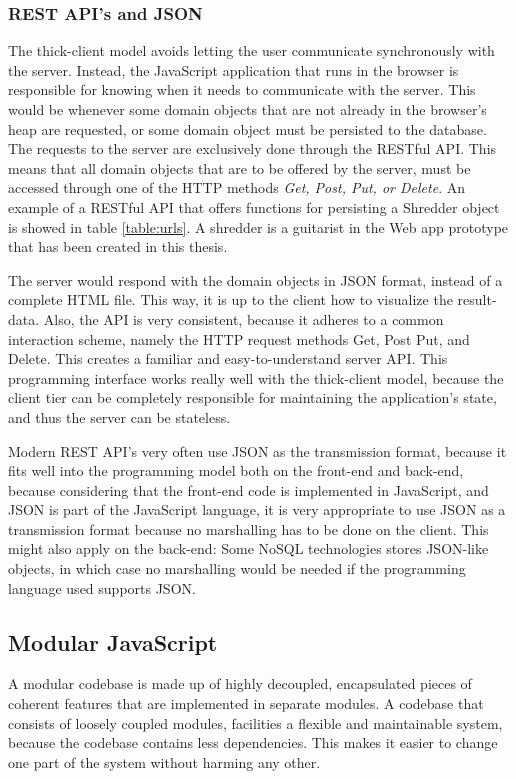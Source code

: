 \subsubsection{REST API's and JSON}
The thick-client model avoids letting the user communicate synchronously with the server. Instead, the JavaScript application that runs in the browser is responsible for knowing when it needs to communicate with the server. This would be whenever some domain objects that are not already in the browser's heap are requested, or some domain object must be persisted to the database. The requests to the server are exclusively done through the RESTful API. This means that all domain objects that are to be offered by the server, must be accessed through one of the HTTP methods \textit{Get, Post, Put, or Delete}. An example of a RESTful API that offers functions for persisting a Shredder object is showed in table \ref{table:urls}. A shredder is a guitarist in the Web app prototype that has been created in this thesis.
	    
	The server would respond with the domain objects in JSON format, instead of a complete HTML file. This way, it is up to the client how to visualize the result-data. Also, the API is very consistent, because it adheres to a common interaction scheme, namely the HTTP request methods Get, Post Put, and Delete. This creates a familiar and easy-to-understand server API. This programming interface works really well with the thick-client model, because the client tier can be completely responsible for maintaining the application's state, and thus the server can be stateless.
	
Modern REST API's very often use JSON as the transmission format, because it fits well into the programming model both on the front-end and back-end, because considering that the front-end code is implemented in JavaScript, and JSON is part of the JavaScript language, it is very appropriate to use JSON as a transmission format because no marshalling has to be done on the client. This might also apply on the back-end: Some NoSQL technologies stores JSON-like objects, in which case no marshalling would be needed if the programming language used supports JSON.
	
\subsection{Modular JavaScript}
A modular codebase is made up of highly decoupled, encapsulated pieces of coherent features that are implemented in separate modules. A codebase that consists of loosely coupled modules, facilities a flexible and maintainable system, because the codebase contains less dependencies\cite{flexible}. This makes it easier to change one part of the system without harming any other.  

